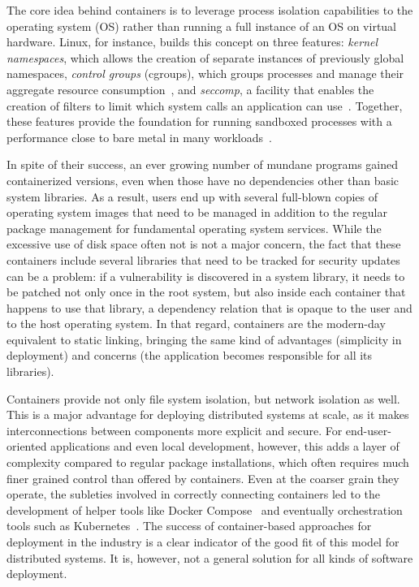 \documentclass[sigplan, anonymous, 10pt]{acmart}
\begin{document}
The core idea behind containers is to leverage process isolation capabilities to the operating
system (OS) rather than running a full instance of an OS on virtual hardware. Linux, for instance,
builds this concept on three features:
\emph{kernel namespaces}, which allows the creation of separate instances of previously global
namespaces,
\emph{control groups} (cgroups), which groups processes and manage their aggregate resource
consumption~\cite{brown2014:cgroups}, and
\emph{seccomp}, a facility that enables the creation of filters to limit which system calls
an application can use~\cite{lwn2015:seccomp}. Together, these features provide the foundation
for running sandboxed processes with a performance close to bare metal in many
workloads~\cite{felter2015:comparison}.

In spite of their success, an ever growing number of mundane programs gained containerized versions,
even when those have no dependencies other than basic system libraries. As a result, users end up
with several full-blown copies of operating system images that need to be managed in addition to
the regular package management for fundamental operating system services. While the excessive use
of disk space often not is not a major concern, the fact that these containers include several
libraries that need to be tracked for security updates can be a problem: if a vulnerability is
discovered in a system library, it needs to be patched not only once in the root system, but
also inside each container that happens to use that library, a dependency relation that is
opaque to the user and to the host operating system. In that regard, containers are the modern-day
equivalent to static linking, bringing the same kind of advantages (simplicity in deployment)
and concerns (the application becomes responsible for all its libraries).

Containers provide not only file system isolation, but network isolation as
well. This is a major advantage for deploying distributed systems at scale, as
it makes interconnections between components more explicit and secure. For
end-user-oriented applications and even local development, however, this adds
a layer of complexity compared to regular package installations, which often
requires much finer grained control than offered by containers. Even at the
coarser grain they operate, the subleties involved in correctly connecting
containers led to the development of helper tools like Docker
Compose~\cite{compose2018} and eventually orchestration tools such as
Kubernetes~\cite{brewer2015:kube}. The success of container-based approaches
for deployment in the industry is a clear indicator of the good fit of this
model for distributed systems. It is, however, not a general solution for all
kinds of software deployment.
\end{document}
